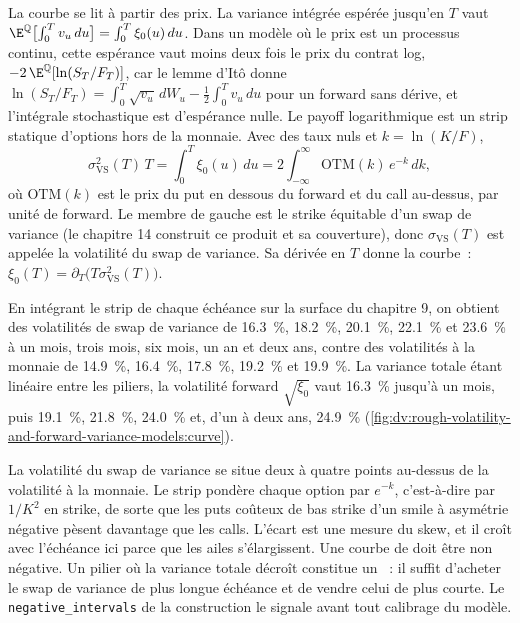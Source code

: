 La courbe se lit à partir des prix. La variance intégrée espérée jusqu'en $T$ vaut
$\E^{\mathbb Q}\bigl[\int_0^Tv_u\,du\bigr]=\int_0^T\xi_0(u)\,du$. Dans un modèle où le prix est un processus continu,
cette espérance vaut moins deux fois le prix du contrat log,
$-2\,\E^{\mathbb Q}[\ln(S_T/F_T)]$, car le lemme d'Itô donne
$\ln(S_T/F_T)=\int_0^T\sqrt{v_u}\,dW_u-\frac12\int_0^Tv_u\,du$ pour un forward sans dérive, et l'intégrale stochastique
est d'espérance nulle. Le payoff logarithmique est un strip statique d'options hors de la monnaie. Avec des taux nuls et
$k=\ln(K/F)$,
\[
\sigma_{\mathrm{VS}}^2(T)\,T=\int_0^T\xi_0(u)\,du=2\int_{-\infty}^{\infty}\mathrm{OTM}(k)\,e^{-k}\,dk,
\]
où $\mathrm{OTM}(k)$ est le prix du put en dessous du forward et du call au-dessus, par unité de forward.
Le membre de gauche est le strike équitable d'un swap de variance (le chapitre 14 construit ce produit et sa couverture), donc
$\sigma_{\mathrm{VS}}(T)$ est appelée la volatilité du swap de variance. Sa dérivée en $T$ donne la courbe~:
$\xi_0(T)=\partial_T\bigl(T\sigma_{\mathrm{VS}}^2(T)\bigr)$.

\begin{example}\label{ex:dv:rough-volatility-and-forward-variance-models:curve}
En intégrant le strip de chaque échéance sur la surface du chapitre 9, on obtient des volatilités de swap de variance de 16.3~\%, 18.2~\%,
20.1~\%, 22.1~\% et 23.6~\% à un mois, trois mois, six mois, un an et deux ans, contre des volatilités à la monnaie de 14.9~\%, 16.4~\%,
17.8~\%, 19.2~\% et 19.9~\%. La variance totale étant linéaire entre les piliers,
la volatilité forward $\sqrt{\xi_0}$ vaut 16.3~\% jusqu'à un mois, puis 19.1~\%, 21.8~\%, 24.0~\% et, d'un à deux ans,
24.9~\% (\cref{fig:dv:rough-volatility-and-forward-variance-models:curve}).
\end{example}

La volatilité du swap de variance se situe deux à quatre points au-dessus de la volatilité à la monnaie. Le strip pondère
chaque option par $e^{-k}$, c'est-à-dire par $1/K^2$ en strike, de sorte que les puts coûteux de bas strike
d'un smile à asymétrie négative pèsent davantage que les calls. L'écart est une mesure du skew, et il croît avec l'échéance
ici parce que les ailes s'élargissent. Une courbe de  doit être non négative. Un pilier où la variance totale
décroît constitue un ~: il suffit d'acheter le swap de variance de plus longue échéance et de vendre celui de plus courte. Le
\texttt{negative\_intervals} de la construction le signale avant tout calibrage du modèle.

